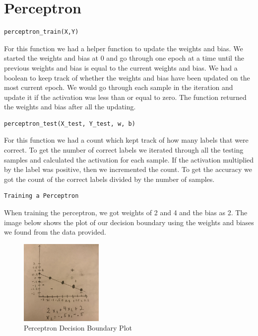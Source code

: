\documentclass[12pt,letterpaper]{article}
\begin{document}
\section*{Perceptron}
    
    \begin{lstlisting}[style = Python]
    perceptron_train(X,Y)
    \end{lstlisting}
    
    \begin{flushleft}For this function we had a helper function to update the weights and bias. We started the weights and bias at 0 and go through one epoch at a time until the previous weights and bias is equal to the current weights and bias. We had a boolean to keep track of whether the weights and bias have been updated on the most current epoch. We would go through each sample in the iteration and update it if the activation was less than or equal to zero. The function returned the weights and bias after all the updating.
    \end{flushleft}
    
    \begin{lstlisting}[style = Python]
    perceptron_test(X_test, Y_test, w, b)
    \end{lstlisting}
    
    \begin{flushleft}For this function we had a count which kept track of how many labels that were correct. To get the number of correct labels we iterated through all the testing samples and calculated the activation for each sample. If the activation multiplied by the label was positive, then we incremented the count. To get the accuracy we got the count of the correct labels divided by the number of samples.
    \end{flushleft}
    
    \begin{lstlisting}[style = Python]
    Training a Perceptron
    \end{lstlisting}
    
    \begin{flushleft}When training the perceptron, we got weights of 2 and 4 and the bias as 2. The image below shows the plot of our decision boundary using the weights and biases we found from the data provided.
    \end{flushleft}

    \begin{figure}[htp]
        \centering
        \includegraphics[width=4cm]{decisionboundary.jpg}
        \caption{Perceptron Decision Boundary Plot}
        \label{fig:decisionboundary}
    \end{figure}
    
\end{document}
